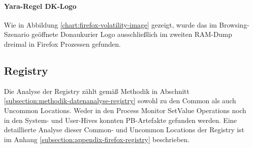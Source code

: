 \paragraph*{Yara-Regel \glqq{}DK-Logo\grqq{}}
Wie in Abbildung \ref{chart:firefox-volatility-image} gezeigt, wurde das im Browsing-Szenario geöffnete Donaukurier Logo ausschließlich im zweiten RAM-Dump dreimal in Firefox Prozessen gefunden.
\begin{table}[h!]
	\label{chart:firefox-volatility-image}
\end{table}




\subsection*{Registry}
\label{subsection:ergebnisse-firefox-registry}
Die Analyse der Registry zählt gemäß Methodik in Abschnitt \ref{subsection:methodik-datenanalyse-registry} sowohl zu den Common als auch Uncommon Locations. Weder in den Process Monitor \glqq{}SetValue\grqq{} Operations noch in den System- und User-Hives konnten PB-Artefakte gefunden werden. Eine detaillierte Analyse dieser Common- und Uncommon Locations der Registry ist im Anhang \ref{subsection:appendix-firefox-registry} beschrieben.


